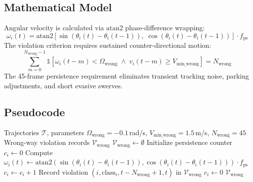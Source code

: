 \subsection{Mathematical Model}
Angular velocity is calculated via $\mathrm{atan2}$ phase-difference wrapping:
\begin{equation}
    \omega_i(t) = \mathrm{atan2}\!\left[\sin(\theta_i(t)-\theta_i(t{-}1)),\;\cos(\theta_i(t)-\theta_i(t{-}1))\right] \cdot f_{\text{ps}}
\end{equation}
The violation criterion requires sustained counter-directional motion:
\begin{equation}
    \sum_{m=0}^{N_{\text{wrong}}-1} \mathbb{1}\left[ \omega_i(t-m) < \Omega_{\text{wrong}} \;\land\; v_i(t-m) \ge V_{\text{min\_wrong}} \right] = N_{\text{wrong}}
\end{equation}
The 45-frame persistence requirement eliminates transient tracking noise, parking adjustments, and short evasive swerves.

\subsection{Pseudocode}
\begin{algorithm}[H]
\caption{Wrong-Way Driving Detection Algorithm}
\label{alg:rule3}
\begin{algorithmic}[1]
\Require Trajectories $\mathcal{T}$, parameters $\Omega_{\text{wrong}} = -0.1$\,rad/s, $V_{\text{min\_wrong}} = 1.5$\,m/s, $N_{\text{wrong}} = 45$
\Ensure Wrong-way violation records $\mathcal{V}_{\text{wrong}}$
\State $\mathcal{V}_{\text{wrong}} \gets \emptyset$
    \State Initialize persistence counter $c_i \gets 0$
        \State Compute $\omega_i(t) \gets \mathrm{atan2}(\sin(\theta_i(t)-\theta_i(t-1)), \cos(\theta_i(t)-\theta_i(t-1))) \cdot f_{\text{ps}}$
            \State $c_i \gets c_i + 1$
                \State Record violation $(i, \text{class}_i, t - N_{\text{wrong}} + 1, t)$ in $\mathcal{V}_{\text{wrong}}$
            \EndIf
        \Else
            \State $c_i \gets 0$
        \EndIf
    \EndFor
\EndFor
\State \Return $\mathcal{V}_{\text{wrong}}$
\end{algorithmic}
\end{algorithm}

